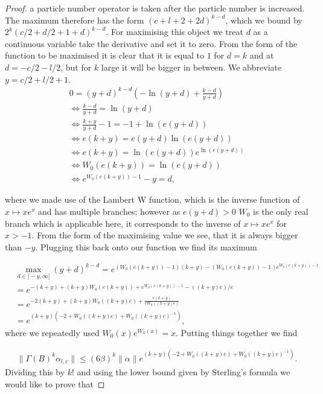 \documentclass[b5paper,draft,openbib,12pt]{memoir}
\begin{document}
\begin{proof}
a particle number operator is taken after the particle number is increased. The maximum therefore has the form \((c+l+2+2d)^{k-d}\), which we bound by
\(2^k (c/2+d/2+1+d)^{k-d}\).
For maximising this object we treat \(d\) as a continuous variable take the derivative and set it to zero. From the form of the function to be maximised
it is clear that it is equal to \(1\) for \(d=k\) and at \(d=-c/2-l/2\), but for \(k\) large it will be bigger in between. We abbreviate \(y=c/2+l/2+1\).
\begin{align}
0= (y+d)^{k-d} (-\ln(y+d) + \frac{k-d}{y+d})\\
\iff \frac{k-d}{y+d}= \ln (y+d)\\
\iff \frac{k+y}{y+d}  -1 = -1 + \ln (e (y+d))\\
\iff e(k+y)=e(y+d)\ln(e(y+d))\\
\iff e(k+y)=\ln(e(y+d)) e^{\ln(e(y+d))}\\
\iff W_0(e(k+y))=\ln(e(y+d))\\
\iff e^{W_0(e(k+y))-1}-y=d,
\end{align}

where we made use of the Lambert W function, which is the inverse function of \(x\mapsto x e^x\) and has multiple branches; however as \(e(y+d)>0\) 
\(W_0\) is the only real branch which is applicable here, it corresponds to the inverse of \(x\mapsto x e^x\) for \(x>-1\). 
From the form of the maximising value we see, that it is always bigger than \(-y\). Plugging this back onto our
function we find its maximum

\begin{align}\nonumber
&\max_{d\in ]-y,\infty[} (y+d)^{k-d}=e^{(W_0(e(k+y))-1) (k+y)- (W_0(e(k+y))-1)e^{W_0(e(k+y))-1}}\\\nonumber
&=e^{-(k+y) + (k+y)W_0(e(k+y)) + e^{W_0(e(k+y))-1} -((k+y)e)/e}\\\nonumber
&=e^{-2(k+y) + (k+y)W_0((k+y)e)+ \frac{e(k+y)}{eW_0((k+y)e)}}\\
&=e^{(k+y)(-2+W_0((k+y)e) + W_0((k+y)e)^{-1})},
\end{align}
where we repeatedly used \(W_0(x)e^{W_0(x)}=x\). Putting things together we find

\begin{align}
\|\Gamma(B)^k\alpha_{l,c}\|\le (6\beta )^k \|\alpha\| e^{(k+y)(-2+W_0((k+y)e) + W_0((k+y)e)^{-1})}.
\end{align}
Dividing this by \(k!\) and using the lower bound given by Sterling's formula we would like to prove that 


\end{proof}
\end{document}
